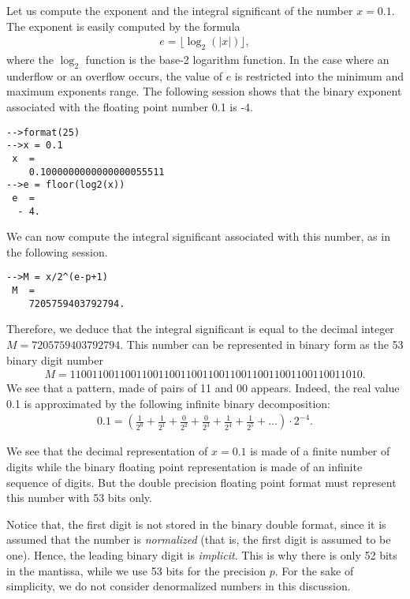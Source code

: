 Let us compute the exponent and the integral significant of the number $x=0.1$.
The exponent is easily computed by the formula 
\begin{eqnarray}
e = \lfloor \log_2(|x|) \rfloor,
\end{eqnarray}
where the $\log_2$ function is the base-2 logarithm function.
In the case where an underflow or an overflow occurs, the value of 
$e$ is restricted into the minimum and maximum exponents range.
The following session shows that the binary exponent associated 
with the floating point number 0.1 is -4.
\begin{lstlisting}
-->format(25)
-->x = 0.1
 x  =
    0.1000000000000000055511  
-->e = floor(log2(x))
 e  =
  - 4.  
\end{lstlisting}
We can now compute the integral significant associated with this 
number, as in the following session.
\begin{lstlisting}
-->M = x/2^(e-p+1)
 M  =
    7205759403792794.  
\end{lstlisting}
Therefore, we deduce that the integral significant is equal to the decimal 
integer $M=7205759403792794$.
This number can be represented in binary form as the 53 binary digit number 
\begin{eqnarray}
M = 11001100110011001100110011001100110011001100110011010.
\end{eqnarray}
We see that a pattern, made of pairs of 11 and 00 appears. 
Indeed, the real value 0.1 is approximated by the following infinite 
binary decomposition:
\begin{eqnarray}
0.1 = \left(\frac{1}{2^0} + \frac{1}{2^1} + \frac{0}{2^2} + \frac{0}{2^3} + \frac{1}{2^4} + \frac{1}{2^5} + \ldots \right) \cdot 2^{-4}.
\end{eqnarray}

We see that the decimal representation of $x=0.1$ is made of a finite number of digits while the 
binary floating point representation is made of an infinite sequence of digits.
But the double precision floating point format must represent this number 
with 53 bits only. 

Notice that, the first digit is not stored in the binary double format, since it is 
assumed that the number is \emph{normalized} (that is, the first digit is assumed 
to be one). Hence, the leading binary digit is \emph{implicit}.
This is why there is only 52 bits in the mantissa, while we use 53 bits for the precision $p$.
For the sake of simplicity, we do not consider denormalized numbers in this discussion. 

